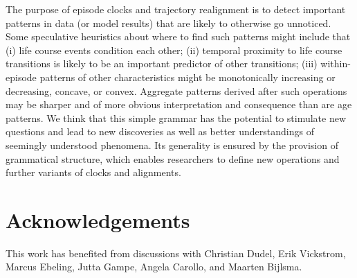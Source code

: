 \documentclass[a4paper,left=1.25cm,right=1.25cm,top=1.25cm,bottom=1.25cm]{article}
\begin{document}
The purpose of episode clocks and trajectory realignment is to detect important patterns in data (or model results) that are likely to otherwise go unnoticed. Some speculative heuristics about where to find such patterns might include that (i) life course events condition each other; (ii) temporal proximity to life course transitions is likely to be an important predictor of other transitions; (iii) within-episode patterns of other characteristics might be monotonically increasing or decreasing, concave, or convex. Aggregate patterns derived after such operations may be sharper and of more obvious interpretation and consequence than are age patterns. We think that this simple grammar has the potential to stimulate new questions and lead to new discoveries as well as better understandings of seemingly understood phenomena. Its generality is ensured by the provision of grammatical structure, which enables researchers to define new operations and further variants of clocks and alignments.


\section*{Acknowledgements}
This work has benefited from discussions with Christian Dudel, Erik Vickstrom, Marcus Ebeling, Jutta Gampe, Angela Carollo, and Maarten Bijlsma. 

\FloatBarrier
\singlespacing

   
\end{document}
